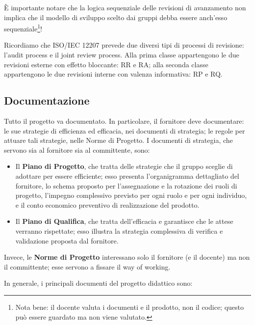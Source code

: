 \documentclass[a4paper]{article}
\begin{document}
		
È importante notare che la logica sequenziale delle revisioni di avanzamento non implica che il modello di sviluppo scelto dai gruppi debba essere anch'esso sequenziale\footnote{Nota bene: il docente valuta i documenti e il prodotto, non il codice; questo può essere guardato ma non viene valutato.}!
		
Ricordiamo che ISO/IEC 12207 prevede due diversi tipi di processi di revisione: l'audit process e il joint review process. Alla prima classe appartengono le due revisioni esterne con effetto bloccante: RR e RA; alla seconda classe appartengono le due revisioni interne con valenza informativa: RP e RQ.

		
	\subsection{Documentazione}

		
Tutto il progetto va documentato. In particolare, il fornitore deve documentare: le sue strategie di efficienza ed efficacia, nei documenti di strategia; le regole per attuare tali strategie, nelle Norme di Progetto. I documenti di strategia, che servono sia al fornitore sia al committente, sono:
		
	\begin{itemize}
		
			
	\item Il \textbf{Piano di Progetto}, che tratta delle strategie che il gruppo sceglie di adottare per essere efficiente; esso presenta l'organigramma dettagliato del fornitore, lo schema proposto per l'assegnazione e la rotazione dei ruoli di progetto, l'impegno complessivo previsto per ogni ruolo e per ogni individuo, e il conto economico preventivo di realizzazione del prodotto.
			
	\item Il \textbf{Piano di Qualifica}, che tratta dell'efficacia e garantisce che le attese verranno rispettate; esso illustra la strategia complessiva di verifica e validazione proposta dal fornitore.
		
	\end{itemize}

		
Invece, le \textbf{Norme di Progetto} interessano solo il fornitore (e il docente) ma non il committente; esse servono a fissare il way of working.
		
In generale, i principali documenti del progetto didattico sono:
		
\end{document}
